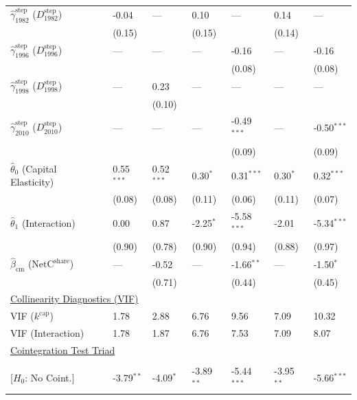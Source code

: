 \begin{table}[H]
\begin{tabular}{p{3.8cm}p{1.35cm}p{1.35cm}p{1.35cm}p{1.35cm}p{1.35cm}p{1.35cm}}
$\hat{\gamma}^{\text{step}}_{1982}$ ($D^{\text{step}}_{1982}$)  & -0.04 & --- & 0.10 & --- & 0.14 & ---  \\
 & {\scriptsize (0.15)} &  & {\scriptsize (0.15)} &  & {\scriptsize (0.14)} &   \\
$\hat{\gamma}^{\text{step}}_{1996}$ ($D^{\text{step}}_{1996}$)  & --- & --- & --- & -0.16 & --- & -0.16  \\
 &  &  &  & {\scriptsize (0.08)} &  & {\scriptsize (0.08)}  \\
$\hat{\gamma}^{\text{step}}_{1998}$ ($D^{\text{step}}_{1998}$)  & --- & 0.23 & --- & --- & --- & ---  \\
 &  & {\scriptsize (0.10)} &  &  &  &   \\
$\hat{\gamma}^{\text{step}}_{2010}$ ($D^{\text{step}}_{2010}$)  & --- & --- & --- & -0.49$^{***}$ & --- & -0.50$^{***}$  \\
 &  &  &  & {\scriptsize (0.09)} &  & {\scriptsize (0.09)}  \\
[1ex]
$\hat{\theta}_0$ (Capital Elasticity)  & 0.55$^{***}$ & 0.52$^{***}$ & 0.30$^{*}$ & 0.31$^{***}$ & 0.30$^{*}$ & 0.32$^{***}$  \\
 & {\scriptsize (0.08)} & {\scriptsize (0.08)} & {\scriptsize (0.11)} & {\scriptsize (0.06)} & {\scriptsize (0.11)} & {\scriptsize (0.07)}  \\
$\hat{\theta}_1$ (Interaction)  & 0.00 & 0.87 & -2.25$^{*}$ & -5.58$^{***}$ & -2.01 & -5.34$^{***}$  \\
 & {\scriptsize (0.90)} & {\scriptsize (0.78)} & {\scriptsize (0.90)} & {\scriptsize (0.94)} & {\scriptsize (0.88)} & {\scriptsize (0.97)}  \\
$\hat{\beta}_{\text{cm}}$ ($\text{NetC}^{\text{share}}$)  & --- & -0.52 & --- & -1.66$^{**}$ & --- & -1.50$^{*}$  \\
 &  & {\scriptsize (0.71)} &  & {\scriptsize (0.44)} &  & {\scriptsize (0.45)}  \\
\midrule
\multicolumn{7}{l}{\underline{Collinearity Diagnostics (VIF)}} \\
VIF ($k^{\text{cap}}$) & 1.78 & 2.88 & 6.76 & 9.56 & 7.09 & 10.32  \\
VIF (Interaction) & 1.78 & 1.87 & 6.76 & 7.53 & 7.09 & 8.07  \\
\midrule
\multicolumn{7}{l}{\underline{Cointegration Test Triad}} \\
\makecell[l]{Resid. ADF ($t_{\text{ADF}}$) \\ {\scriptsize [$H_0$: No Coint.]}} & -3.79$^{**}$ & -4.09$^{*}$ & -3.89$^{**}$ & -5.44$^{***}$ & -3.95$^{**}$ & -5.66$^{***}$  \\

\end{tabular}
\end{table}
